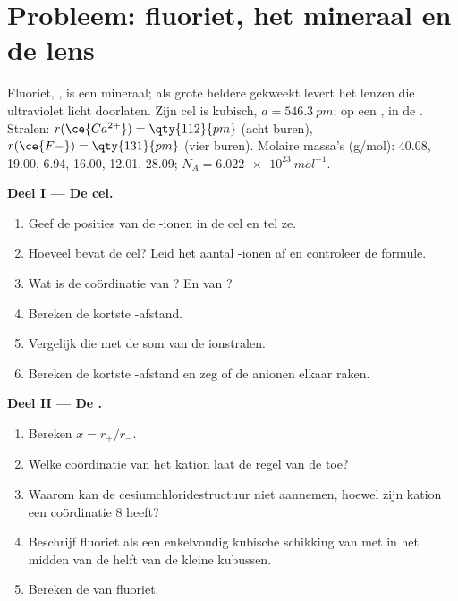 \section{Probleem: fluoriet, het mineraal en de lens}

\begin{problem}
\label{pb:b1:crystals-ionic-covalent:1}
Fluoriet, , is een mineraal; als grote heldere  gekweekt
levert het lenzen die ultraviolet licht doorlaten. Zijn cel is kubisch,
$a =
\qty{546.3}{pm}$;  op een ,  in de
. Stralen: $r(\ce{Ca^{2+}}) = \qty{112}{pm}$ (acht
buren), $r(\ce{F-}) = \qty{131}{pm}$ (vier buren). Molaire massa's
(g/mol):  40.08,  19.00,  6.94,  16.00, 
12.01,  28.09; $N_A = \qty{6.022e23}{mol^{-1}}$.

\medskip
\noindent\textbf{Deel I --- De cel.}
\begin{enumerate}
  \item Geef de posities van de -ionen in de cel en tel ze.
  \item Hoeveel  bevat de cel? Leid het aantal
        -ionen af en controleer de formule.
  \item Wat is de coördinatie van ? En van ?
  \item Bereken de kortste -afstand.
  \item Vergelijk die met de som van de ionstralen.
  \item Bereken de kortste -afstand en zeg of de anionen elkaar
        raken.
\end{enumerate}

\medskip
\noindent\textbf{Deel II --- De .}
\begin{enumerate}[resume]
  \item Bereken $x = r_+/r_-$.
  \item Welke coördinatie van het kation laat de regel van de
         toe?
  \item Waarom kan  de cesiumchloridestructuur niet aannemen,
        hoewel zijn kation een coördinatie 8 heeft?
  \item Beschrijf fluoriet als een enkelvoudig kubische schikking van
         met  in het midden van de helft van de kleine
        kubussen.
  \item Bereken de  van fluoriet.
\end{enumerate}


\end{problem}
